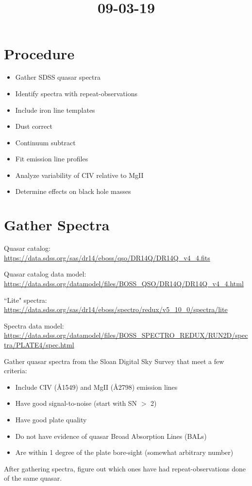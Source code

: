 \documentclass[12pt]{article}
\begin{document}
\title{09-03-19}
\author{}
\maketitle
    \section{Procedure}
        \begin{itemize}
            \item Gather SDSS quasar spectra
            \item Identify spectra with repeat-observations
            \item Include iron line templates
            \item Dust correct
            \item Continuum subtract
            \item Fit emission line profiles
            \item Analyze variability of CIV relative to MgII
            \item Determine effects on black hole masses
        \end{itemize}

    \section{Gather Spectra}
        Quasar catalog: \url{https://data.sdss.org/sas/dr14/eboss/qso/DR14Q/DR14Q_v4_4.fits}

        Quasar catalog data model: \url{https://data.sdss.org/datamodel/files/BOSS_QSO/DR14Q/DR14Q_v4_4.html}

        ``Lite" spectra: \url{https://data.sdss.org/sas/dr14/eboss/spectro/redux/v5_10_0/spectra/lite}

        Spectra data model: \url{https://data.sdss.org/datamodel/files/BOSS_SPECTRO_REDUX/RUN2D/spectra/PLATE4/spec.html}

        Gather quasar spectra from the Sloan Digital Sky Survey that meet a few criteria:
        \begin{itemize}
            \item Include CIV (\AA 1549) and MgII (\AA 2798) emission lines
            \item Have good signal-to-noise (start with SN $>$ 2)
            \item Have good plate quality
            \item Do not have evidence of quasar Broad Absorption Lines (BALs)
            \item Are within 1 degree of the plate bore-sight (somewhat arbitrary number)
        \end{itemize}

        After gathering spectra, figure out which ones have had repeat-observations done of the same quasar.
\end{document}
